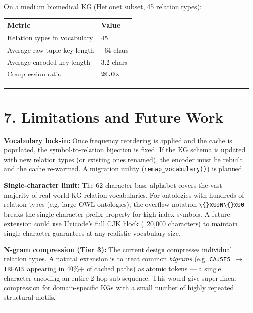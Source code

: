 On a medium biomedical KG (Hetionet subset, 45 relation types):

\begin{table}[h]
\small\centering
\begin{tabular}{ll}
\toprule
Metric & Value \\
\midrule
Relation types in vocabulary & 45 \\
Average raw tuple key length & ~64 chars \\
Average encoded key length & 3.2 chars \\
Compression ratio & \textbf{20.0$\times$} \\
\bottomrule
\end{tabular}
\end{table}


\medskip\noindent\rule{\linewidth}{0.4pt}\medskip

\section*{7. Limitations and Future Work}

\textbf{Vocabulary lock-in:} Once frequency reordering is applied and the cache is
populated, the symbol-to-relation bijection is fixed.  If the KG schema is
updated with new relation types (or existing ones renamed), the encoder must
be rebuilt and the cache re-warmed.  A migration utility (\texttt{remap\_vocabulary()})
is planned.

\textbf{Single-character limit:} The 62-character base alphabet covers the vast
majority of real-world KG relation vocabularies.  For ontologies with
hundreds of relation types (e.g. large OWL ontologies), the overflow notation
\texttt{\textbackslash\{\}x00N\textbackslash\{\}x00} breaks the single-character prefix property for high-index symbols.
A future extension could use Unicode's full CJK block (~20,000 characters) to
maintain single-character guarantees at any realistic vocabulary size.

\textbf{N-gram compression (Tier 3):} The current design compresses individual relation
types.  A natural extension is to treat common \textit{bigrams} (e.g. \texttt{CAUSES $\to$ TREATS}
appearing in 40\%+ of cached paths) as atomic tokens --- a single character encoding
an entire 2-hop sub-sequence.  This would give super-linear compression for
domain-specific KGs with a small number of highly repeated structural motifs.

\medskip\noindent\rule{\linewidth}{0.4pt}\medskip

